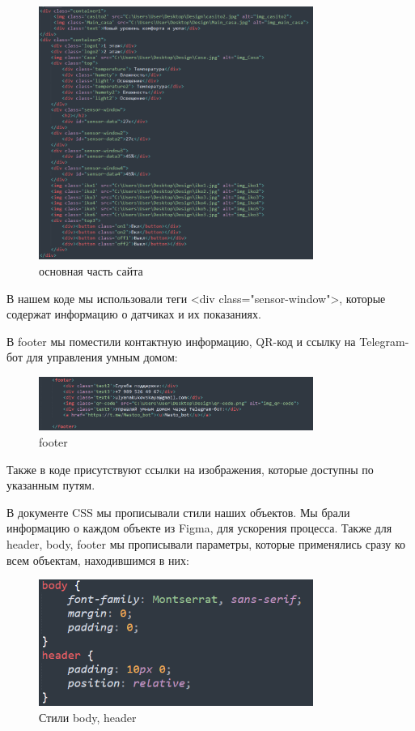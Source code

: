 \begin{figure}[h!]
	\centering
	\label{fig:img29}
	\includegraphics[width=0.8\textwidth]{./graphics/img/image29.png}
	\caption{основная часть сайта}
\end{figure}

В нашем коде мы использовали теги <div class="sensor-window">, которые содержат информацию о датчиках и их показаниях.

В footer мы поместили контактную информацию, QR-код  и ссылку на Telegram-бот для управления умным домом:

\begin{figure}[h!]
	\centering
	\label{fig:img18}
	\includegraphics[width=0.8\textwidth]{./graphics/img/image18.png}
	\caption{footer}
\end{figure}

Также в коде присутствуют ссылки на изображения, которые доступны по указанным путям.

В документе CSS мы прописывали стили наших объектов. Мы брали информацию о каждом объекте из Figma, для ускорения процесса. Также для header, body, footer мы прописывали параметры, которые применялись сразу ко всем объектам, находившимся в них:

\begin{figure}[h!]
	\centering
	\label{fig:img16}
	\includegraphics[width=0.8\textwidth]{./graphics/img/image16.png}
	\caption{Стили body, header}
\end{figure}	


